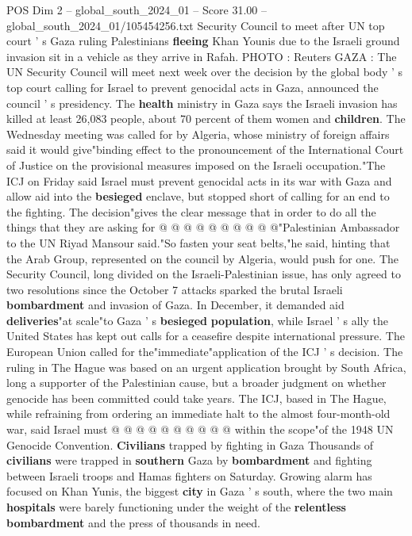 \begin{textsample}{POS Dim 2 – global\_south\_2024\_01 – Score 31.00 – global\_south\_2024\_01/105454256.txt}  \label{ex:f2_pos_125}
Security Council to meet after UN top court ' s Gaza ruling Palestinians \textbf{fleeing} Khan Younis due to the Israeli ground invasion sit in a vehicle as they arrive in Rafah.
PHOTO : Reuters GAZA : The UN Security Council will meet next week over the decision by the global body ' s top court calling for Israel to prevent genocidal acts in Gaza, announced the council ' s presidency.
The \textbf{health} ministry in Gaza says the Israeli invasion has killed at least 26,083 people, about 70 percent of them women and \textbf{children}.
The Wednesday meeting was called for by Algeria, whose ministry of foreign affairs said it would give"binding effect to the pronouncement of the International Court of Justice on the provisional measures imposed on the Israeli occupation."The ICJ on Friday said Israel must prevent genocidal acts in its war with Gaza and allow aid into the \textbf{besieged} enclave, but stopped short of calling for an end to the fighting.
The decision"gives the clear message that in order to do all the things that they are asking for @ @ @ @ @ @ @ @ @ @"Palestinian Ambassador to the UN Riyad Mansour said."So fasten your seat belts,"he said, hinting that the Arab Group, represented on the council by Algeria, would push for one.
The Security Council, long divided on the Israeli-Palestinian issue, has only agreed to two resolutions since the October 7 attacks sparked the brutal Israeli \textbf{bombardment} and invasion of Gaza.
In December, it demanded aid \textbf{deliveries}"at scale"to Gaza ' s \textbf{besieged} \textbf{population}, while Israel ' s ally the United States has kept out calls for a ceasefire despite international pressure.
The European Union called for the"immediate"application of the ICJ ' s decision.
The ruling in The Hague was based on an urgent application brought by South Africa, long a supporter of the Palestinian cause, but a broader judgment on whether genocide has been committed could take years.
The ICJ, based in The Hague, while refraining from ordering an immediate halt to the almost four-month-old war, said Israel must @ @ @ @ @ @ @ @ @ @ within the scope"of the 1948 UN Genocide Convention. \textbf{Civilians} trapped by fighting in Gaza Thousands of \textbf{civilians} were trapped in \textbf{southern} Gaza by \textbf{bombardment} and fighting between Israeli troops and Hamas fighters on Saturday.
Growing alarm has focused on Khan Yunis, the biggest \textbf{city} in Gaza ' s south, where the two main \textbf{hospitals} were barely functioning under the weight of the \textbf{relentless} \textbf{bombardment} and the press of thousands in need.

\end{textsample}
